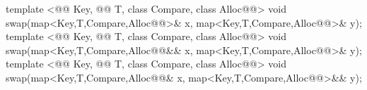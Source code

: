 \documentclass[american,twoside]{book}
\begin{document}
\begin{codeblock}
{  template <@@ Key, @@ T, class Compare, class Alloc@@>
    void swap(map<Key,T,Compare,Alloc@@>& x,
              map<Key,T,Compare,Alloc@@>& y);
  template <@@ Key, @@ T, class Compare, class Alloc@@>
    void swap(map<Key,T,Compare,Alloc@@&& x,
              map<Key,T,Compare,Alloc@@>& y);
  template <@@ Key, @@ T, class Compare, class Alloc@@>
    void swap(map<Key,T,Compare,Alloc@@& x,
              map<Key,T,Compare,Alloc@@>&& y);

}
\end{codeblock}
\end{document}
